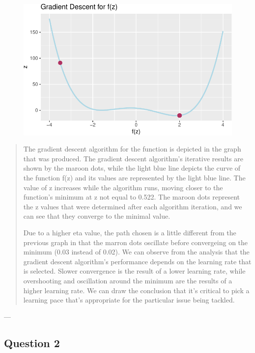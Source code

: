 \documentclass[
  letterpaper,
  DIV=11,
  numbers=noendperiod]{scrartcl}
\begin{document}
\begin{figure}[H]

{\centering \includegraphics{index_files/figure-pdf/unnamed-chunk-6-1.pdf}

}

\end{figure}

\begin{quote}
The gradient descent algorithm for the function is depicted in the graph
that was produced. The gradient descent algorithm's iterative results
are shown by the maroon dots, while the light blue line depicts the
curve of the function f(z) and its values are represented by the light
blue line. The value of z increases while the algorithm runs, moving
closer to the function's minimum at z not equal to 0.522. The maroon
dots represent the z values that were determined after each algorithm
iteration, and we can see that they converge to the minimal value.

Due to a higher eta value, the path chosen is a little different from
the previous graph in that the marron dots oscillate before convergeing
on the minimum (0.03 instead of 0.02). We can observe from the analysis
that the gradient descent algorithm's performance depends on the
learning rate that is selected. Slower convergence is the result of a
lower learning rate, while overshooting and oscillation around the
minimum are the results of a higher learning rate. We can draw the
conclusion that it's critical to pick a learning pace that's appropriate
for the particular issue being tackled.
\end{quote}

---

\hypertarget{question-2}{%
\subsection{Question 2}\label{question-2}}
\end{document}
